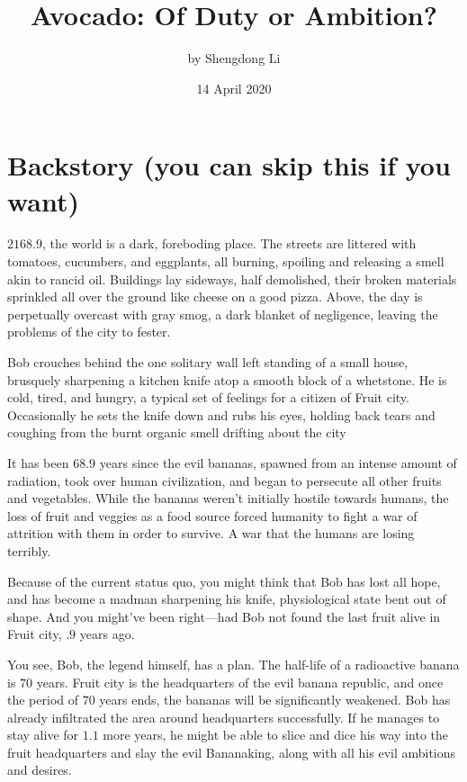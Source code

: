 \documentclass[letterpaper, 12pt]{article}
\begin{document}
\title{Avocado: Of Duty or Ambition?}
\author{by Shengdong Li}
\date{14 April 2020}
\maketitle
\section{Backstory (you can skip this if you want)}
$2168.9$, the world is a dark, foreboding place. The streets are littered with tomatoes, cucumbers, and eggplants, all burning, spoiling and releasing a smell akin to rancid oil. Buildings lay sideways, half demolished, their broken materials sprinkled all over the ground like cheese on a good pizza. Above, the day is perpetually overcast with gray smog, a dark blanket of negligence, leaving the problems of the city to fester. \par
Bob crouches behind the one solitary wall left standing of a small house, brusquely sharpening a kitchen knife atop a smooth block of a whetstone. He is cold, tired, and hungry, a typical set of feelings for a citizen of Fruit city. Occasionally he sets the knife down and rubs his eyes, holding back tears and coughing from the burnt organic smell drifting about the city \par
It has been $68.9$ years since the evil bananas, spawned from an intense amount of radiation, took over human civilization, and began to persecute all other fruits and vegetables. While the bananas weren’t initially hostile towards humans, the loss of fruit and veggies as a food source forced humanity to fight a war of attrition with them in order to survive. A war that the humans are losing terribly. \par
Because of the current status quo, you might think that Bob has lost all hope, and has become a madman sharpening his knife, physiological state bent out of shape. And you might’ve been right—had Bob not found the last fruit alive in Fruit city, $.9$ years ago. \par
You see, Bob, the legend himself, has a plan. The half-life of a radioactive banana is $70$ years. Fruit city is the headquarters of the evil banana republic, and once the period of $70$ years ends, the bananas will be significantly weakened. Bob has already infiltrated the area around headquarters successfully. If he manages to stay alive for $1.1$ more years, he might be able to slice and dice his way into the fruit headquarters and slay the evil Bananaking, along with all his evil ambitions and desires. \par
\end{document}
